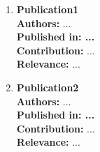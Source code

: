 \normalsize
{} 

\begin{enumerate}
\item\textbf{Publication1}\\
\normalsize
\textbf{Authors:} ... \\
\textbf{Published in: ... } \\
\textbf{Contribution:} ... \\
\textbf{Relevance:} ...

\item\textbf{Publication2}\\
\normalsize
\textbf{Authors:} ... \\
\textbf{Published in: ... } \\
\textbf{Contribution:} ... \\
\textbf{Relevance:} ...




\end{enumerate}
